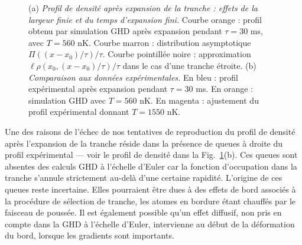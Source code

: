 \begin{figure}[!htb]
\centering
{}
\caption{(a) {\it Profil de densité après expansion de la tranche : effets de la largeur finie et du temps d’expansion fini.} Courbe orange : profil obtenu par simulation GHD après expansion pendant $\tau = 30$ ms, avec $T = 560$ nK. Courbe marron : distribution asymptotique $\Pi((x - x_0)/\tau)/\tau$. Courbe pointillée noire : approximation $\ell \rho(x_0, (x - x_0)/\tau)/\tau$ dans le cas d’une tranche étroite. (b) {\it Comparaison aux données expérimentales.} En bleu : profil expérimental après expansion pendant $\tau = 30$ ms. En orange : simulation GHD avec $T = 560$ nK. En magenta : ajustement du profil expérimental donnant $T = 1550$ nK.}
\label{fig:simul_expansion}
\end{figure}


Une des raisons de l'échec de nos tentatives de reproduction du profil de densité après l'expansion de la tranche réside dans la présence de queues à droite du profil expérimental — voir le profil de densité dans la Fig.~\ref{fig:simul_expansion}(b). Ces queues sont absentes des calculs GHD à l’échelle d’Euler car la fonction d’occupation dans la tranche s’annule strictement au-delà d’une certaine rapidité. L’origine de ces queues reste incertaine. Elles pourraient être dues à des effets de bord associés à la procédure de sélection de tranche, les atomes en bordure étant chauffés par le faisceau de poussée. Il est également possible qu’un effet diffusif, non pris en compte dans la GHD à l’échelle d’Euler, intervienne au début de la déformation du bord, lorsque les gradients sont importants.

